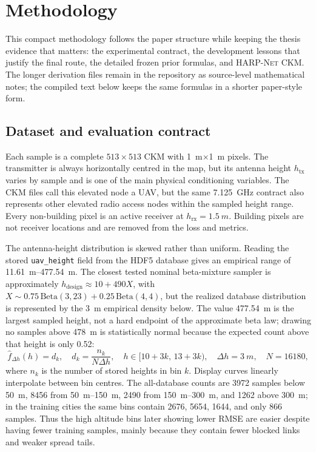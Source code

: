\chapter{Methodology}
\label{chap:methodology}

This compact methodology follows the paper structure while keeping the thesis
evidence that matters: the experimental contract, the development lessons that
justify the final route, the detailed frozen prior formulas, and
\textsc{HARP-Net CKM}. The longer derivation files remain in the
repository as source-level mathematical notes; the compiled text below keeps
the same formulas in a shorter paper-style form.

\section{Dataset and evaluation contract}

Each sample is a complete \(513\times513\) CKM with
\SI{1}{m}\(\times\)\SI{1}{m} pixels. The transmitter is always
horizontally centred in the map, but its antenna height \(h_{\mathrm{tx}}\)
varies by sample and is one of the main physical conditioning variables. The
CKM files call this elevated node a UAV, but the same \SI{7.125}{GHz} contract
also represents other elevated radio access nodes within the sampled height
range. Every
non-building pixel is an active receiver at
\(h_{\mathrm{rx}}=\SI{1.5}{m}\). Building pixels are not receiver locations and
are removed from the loss and metrics.

The antenna-height distribution is skewed rather than uniform. Reading the
stored \texttt{uav\_height} field from the HDF5 database gives an empirical
range of \SIrange{11.61}{477.54}{m}. The closest tested nominal beta-mixture
sampler is approximately
\(h_{\mathrm{design}}\approx 10+490X\), with
\(X\sim0.75\,\mathrm{Beta}(3,23)+0.25\,\mathrm{Beta}(4,4)\), but the realized
database distribution is represented by the \SI{3}{m} empirical density below.
The value \SI{477.54}{m} is the largest sampled height, not a hard endpoint of
the approximate beta law; drawing no samples above \SI{478}{m} is statistically
normal because the expected count above that height is only 0.52:
\begin{equation}
  \hat f_{\Delta h}(h) = d_k,\quad
  d_k=\frac{n_k}{N\Delta h},\quad
  h\in[10+3k,\,13+3k),\quad
  \Delta h=\SI{3}{m},\quad N=16180 ,
  \label{eq:height_empirical_histogram}
\end{equation}
where \(n_k\) is the number of stored heights in bin \(k\). Display curves
linearly interpolate between bin centres. The all-database counts are 3972
samples below \SI{50}{m}, 8456 from \SIrange{50}{150}{m}, 2490 from
\SIrange{150}{300}{m}, and 1262 above \SI{300}{m}; in the training cities the
same bins contain 2676, 5654, 1644, and only 866 samples. Thus the
high altitude bins later showing lower RMSE are easier despite having fewer
training samples, mainly because they contain fewer blocked links and weaker
spread tails.

